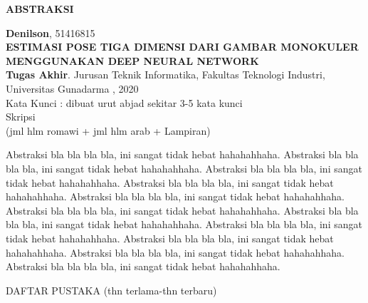 \newpage %
\begin{center}
\begin{large}\textbf{ABSTRAKSI}\end{large}
\end{center}

\vspace{5mm} 

\noindent \textbf{Denilson}, 51416815 \\[-10pt]
\textbf{ESTIMASI POSE TIGA DIMENSI DARI GAMBAR MONOKULER}\\[-10pt]
\textbf{MENGGUNAKAN DEEP NEURAL NETWORK} \\[-10pt]
\textbf{Tugas Akhir}. Jurusan Teknik Informatika, Fakultas Teknologi Industri, \\[-10pt]
Universitas Gunadarma , 2020\\[-10pt]
Kata Kunci : dibuat urut abjad sekitar 3-5 kata kunci\\[-10pt]
Skripsi\\[-10pt]
(jml hlm romawi + jml hlm arab + Lampiran)

Abstraksi bla bla bla bla, ini sangat tidak hebat hahahahhaha.
Abstraksi bla bla bla bla, ini sangat tidak hebat hahahahhaha.
Abstraksi bla bla bla bla, ini sangat tidak hebat hahahahhaha.
Abstraksi bla bla bla bla, ini sangat tidak hebat hahahahhaha.
Abstraksi bla bla bla bla, ini sangat tidak hebat hahahahhaha.
Abstraksi bla bla bla bla, ini sangat tidak hebat hahahahhaha.
Abstraksi bla bla bla bla, ini sangat tidak hebat hahahahhaha.
Abstraksi bla bla bla bla, ini sangat tidak hebat hahahahhaha.
Abstraksi bla bla bla bla, ini sangat tidak hebat hahahahhaha.
Abstraksi bla bla bla bla, ini sangat tidak hebat hahahahhaha.
Abstraksi bla bla bla bla, ini sangat tidak hebat hahahahhaha.

\noindent DAFTAR PUSTAKA (thn terlama-thn terbaru)
